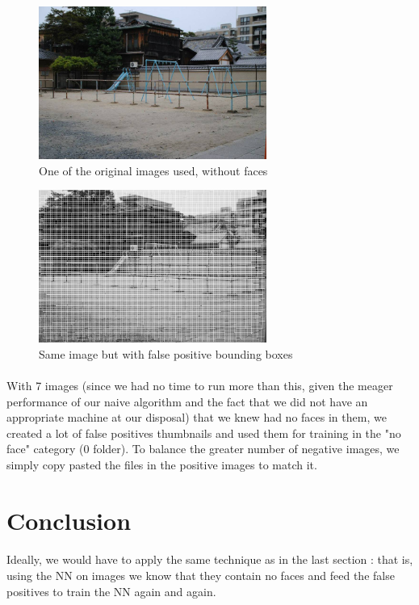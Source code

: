 \documentclass[french]{article}
\begin{document}
\begin{figure}[h]
\includegraphics[height=5cm]{1.jpg}
\centering
\caption{One of the original images used, without faces}
\end{figure}

\begin{figure}[h]
\includegraphics[height=5cm]{1_boxes.jpg}
\centering
\caption{Same image but with false positive bounding boxes}
\end{figure}

\paragraph{} With 7 images (since we had no time to run more than this, given the meager performance of our naive algorithm and the fact that we did not have an appropriate machine at our disposal) that we knew had no faces in them, we created a lot of false positives thumbnails and used them for training in the "no face" category (0 folder). To balance the greater number of negative images, we simply copy pasted the files in the positive images to match it.

\newpage

\section{Conclusion}

\paragraph{} Ideally, we would have to apply the same technique as in the last section : that is, using the NN on images we know that they contain no faces and feed the false positives to train the NN again and again.
\end{document}
